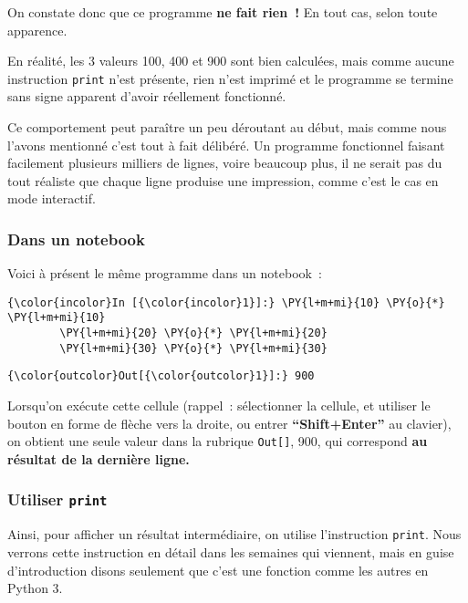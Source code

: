     On constate donc que ce programme \textbf{ne fait rien~!} En tout cas,
selon toute apparence.

En réalité, les 3 valeurs 100, 400 et 900 sont bien calculées, mais
comme aucune instruction \texttt{print} n'est présente, rien n'est
imprimé et le programme se termine sans signe apparent d'avoir
réellement fonctionné.

Ce comportement peut paraître un peu déroutant au début, mais comme nous
l'avons mentionné c'est tout à fait délibéré. Un programme fonctionnel
faisant facilement plusieurs milliers de lignes, voire beaucoup plus, il
ne serait pas du tout réaliste que chaque ligne produise une impression,
comme c'est le cas en mode interactif.

    \hypertarget{dans-un-notebook}{%
\subsubsection{Dans un notebook}\label{dans-un-notebook}}

    Voici à présent le même programme dans un notebook~:

    \begin{Verbatim}[commandchars=\\\{\}]
{\color{incolor}In [{\color{incolor}1}]:} \PY{l+m+mi}{10} \PY{o}{*} \PY{l+m+mi}{10}
        \PY{l+m+mi}{20} \PY{o}{*} \PY{l+m+mi}{20}
        \PY{l+m+mi}{30} \PY{o}{*} \PY{l+m+mi}{30}
\end{Verbatim}


\begin{Verbatim}[commandchars=\\\{\}]
{\color{outcolor}Out[{\color{outcolor}1}]:} 900
\end{Verbatim}
            
    Lorsqu'on exécute cette cellule (rappel~: sélectionner la cellule, et
utiliser le bouton en forme de flèche vers la droite, ou entrer
\textbf{``Shift+Enter''} au clavier), on obtient une seule valeur dans
la rubrique \texttt{Out{[}{]}}, 900, qui correspond \textbf{au résultat
de la dernière ligne.}

    \hypertarget{utiliser-print}{%
\subsubsection{\texorpdfstring{Utiliser
\texttt{print}}{Utiliser print}}\label{utiliser-print}}

    Ainsi, pour afficher un résultat intermédiaire, on utilise l'instruction
\texttt{print}. Nous verrons cette instruction en détail dans les
semaines qui viennent, mais en guise d'introduction disons seulement que
c'est une fonction comme les autres en Python 3.

